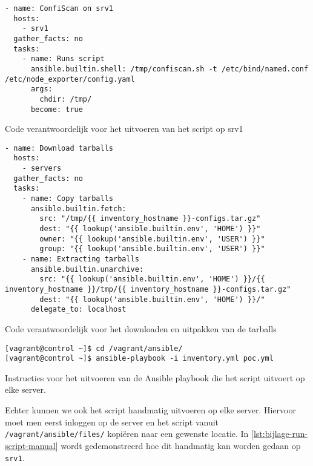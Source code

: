 \begin{listing}
  \begin{verbatim}
- name: ConfiScan on srv1
  hosts:
    - srv1
  gather_facts: no
  tasks:
    - name: Runs script
      ansible.builtin.shell: /tmp/confiscan.sh -t /etc/bind/named.conf /etc/node_exporter/config.yaml
      args:
        chdir: /tmp/
      become: true
    \end{verbatim}
    \caption{Code verantwoordelijk voor het uitvoeren van het script op srv1}
    \label{lst:bijlage-run-script}
\end{listing}

\begin{listing}
  \begin{verbatim}
- name: Download tarballs
  hosts:
    - servers
  gather_facts: no
  tasks:
    - name: Copy tarballs
      ansible.builtin.fetch:
        src: "/tmp/{{ inventory_hostname }}-configs.tar.gz"
        dest: "{{ lookup('ansible.builtin.env', 'HOME') }}"
        owner: "{{ lookup('ansible.builtin.env', 'USER') }}"
        group: "{{ lookup('ansible.builtin.env', 'USER') }}"
    - name: Extracting tarballs
      ansible.builtin.unarchive:
        src: "{{ lookup('ansible.builtin.env', 'HOME') }}/{{ inventory_hostname }}/tmp/{{ inventory_hostname }}-configs.tar.gz"
        dest: "{{ lookup('ansible.builtin.env', 'HOME') }}/"
      delegate_to: localhost
  \end{verbatim}
  \caption{Code verantwoordelijk voor het downloaden en uitpakken van de tarballs}
  \label{lst:bijlage-tarballs}
\end{listing}

\begin{listing}
  \begin{verbatim}
[vagrant@control ~]$ cd /vagrant/ansible/
[vagrant@control ~]$ ansible-playbook -i inventory.yml poc.yml
  \end{verbatim}
  \caption{Instructies voor het uitvoeren van de Ansible playbook die het script uitvoert op elke server.}
  \label{lst:bijlage-run-playbook}
\end{listing}

Echter kunnen we ook het script handmatig uitvoeren op elke server.
Hiervoor moet men eerst inloggen op de server en het script vanuit \texttt{/vagrant/ansible/files/} kopi\"eren naar een gewenste locatie.
In \ref{lst:bijlage-run-script-manual} wordt gedemonstreerd hoe dit handmatig kan worden gedaan op \texttt{srv1}.

